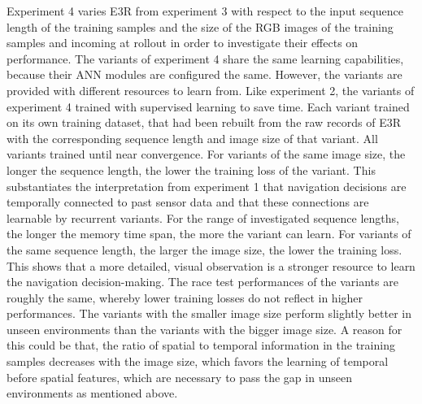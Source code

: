 Experiment 4 varies E3R from experiment 3 with respect to the input sequence length 
of the training samples and the size of the RGB images of the training samples and 
incoming at rollout in order to investigate their effects on performance. 
The variants of experiment 4 share the same learning capabilities, because their ANN 
modules are configured the same. However, the variants are provided with different 
resources to learn from. Like experiment 2, the variants of experiment 4 trained with 
supervised learning to save time. Each variant trained on its own training dataset, 
that had been rebuilt from the raw records of E3R with the corresponding sequence length 
and image size of that variant. All variants trained until near convergence. For variants 
of the same image size, the longer the sequence length, the lower the training loss of the 
variant. This substantiates the interpretation from experiment 1 that navigation decisions 
are temporally connected to past sensor data and that these connections are learnable by 
recurrent variants. For the range of investigated sequence lengths, the longer the memory 
time span, the more the variant can learn. For variants of the same sequence length, the 
larger the image size, the lower the training loss. This shows that a more detailed, visual 
observation is a stronger resource to learn the navigation decision-making. The race test 
performances of the variants are roughly the same, whereby lower training losses do not 
reflect in higher performances. The variants with the smaller image size perform slightly 
better in unseen environments than the variants with the bigger image size. A reason for 
this could be that, the ratio of spatial to temporal information in the training samples 
decreases with the image size, which favors the learning of temporal before spatial features, 
which are necessary to pass the gap in unseen environments as mentioned above.

